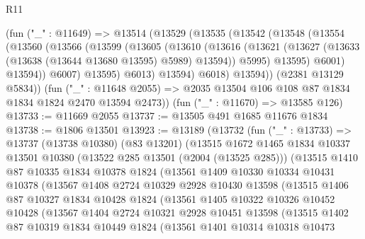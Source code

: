 \begin{lexlean}{R11}
\begin{coremodule}
      (fun ("_" : @11649) =>
      @13514
        (@13529
          (@13535
            (@13542
              (@13548
                (@13554
                  (@13560
                    (@13566
                      (@13599
                        (@13605
                          (@13610
                            (@13616
                              (@13621
                                (@13627 (@13633 (@13638 (@13644 @13680 @13595) @5989) @13594))
                                @5995)
                              @13595)
                            @6001)
                          @13594))
                      @6007)
                    @13595)
                  @6013)
                @13594)
              @6018)
            @13594))
        (@2381 @13129 @5834))
      (fun ("_" : @11648 @2055) => @2035 @13504 @106 @108 @87 @1834 @1834 @1824 @2470 @13594 @2473))
    (fun ("_" : @11670) => @13585 @126)
@13733 := @11669 @2055
@13737 := @13505 @491 @1685 @11676 @1834
@13738 := @1806 @13501
@13923 := @13189
    (@13732
      (fun ("_" : @13733) =>
      @13737
        (@13738 @10380)
        (@83 @13201)
        (@13515
          @1672
          @1465
          @1834
          @10337
          @13501
          @10380
          (@13522 @285 @13501 (@2004 (@13525 @285)))
          (@13515
            @1410
            @87
            @10335
            @1834
            @10378
            @1824
            (@13561
              @1409
              @10330
              @10334
              @10431
              @10378
              (@13567
                @1408
                @2724
                @10329
                @2928
                @10430
                @13598
                (@13515
                  @1406
                  @87
                  @10327
                  @1834
                  @10428
                  @1824
                  (@13561
                    @1405
                    @10322
                    @10326
                    @10452
                    @10428
                    (@13567
                      @1404
                      @2724
                      @10321
                      @2928
                      @10451
                      @13598
                      (@13515
                        @1402
                        @87
                        @10319
                        @1834
                        @10449
                        @1824
                        (@13561
                          @1401
                          @10314
                          @10318
                          @10473

\end{coremodule}
\end{lexlean}
